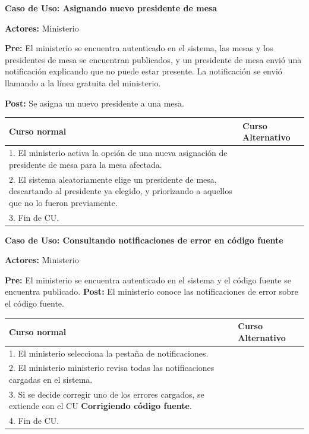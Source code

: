 \textbf{Caso de Uso: Asignando nuevo presidente de mesa}

\textbf{Actores:} Ministerio 

\textbf{Pre:} El ministerio se encuentra autenticado en el sistema, las mesas y los presidentes de mesa se encuentran publicados, y un presidente de mesa envió una notificación explicando que no puede estar presente. La notificación se envió llamando a la línea gratuita del ministerio.

\textbf{Post:} Se asigna un nuevo presidente a una mesa.
\begin{table}[h!]
	
 \begin{tabular}{|p{7.5cm} | p{7.5cm}|} 
 \hline
 \textbf{Curso normal} & \textbf{Curso Alternativo} \\
 \hline

1. El ministerio activa la opción de una nueva asignación de presidente de mesa para la mesa afectada. & \\
\hline

2.  El sistema aleatoriamente elige un presidente de mesa, descartando al presidente ya elegido, y priorizando a aquellos que no lo fueron previamente. & \\
\hline


3. Fin de CU. & \\
\hline



 \end{tabular}

\end{table}


\textbf{Caso de Uso: Consultando notificaciones de error en código fuente}

\textbf{Actores:} Ministerio 

\textbf{Pre:} El ministerio se encuentra autenticado en el sistema y el código fuente se encuentra publicado.
\textbf{Post:} El ministerio conoce las notificaciones de error sobre el código fuente.


\begin{table}[h!]
	
 \begin{tabular}{|p{7.5cm} | p{7.5cm}|} 
 \hline
 \textbf{Curso normal} & \textbf{Curso Alternativo} \\
 \hline


1. El ministerio selecciona la pestaña de notificaciones. & \\
\hline


2. El ministerio ministerio revisa todas las notificaciones cargadas en el sistema. & \\
\hline


3. Si se decide corregir uno de los errores cargados, se extiende con el CU \textbf{Corrigiendo código fuente}. & \\
\hline


4. Fin de CU. & \\
\hline




 \end{tabular}

\end{table}



